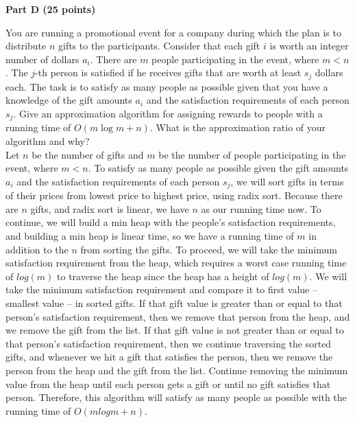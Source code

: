 \documentclass{article}
\begin{document}
\begin{center}
{\bf Part D (25 points)}
\end{center}

 You are running a promotional event for a
company during which the plan is to distribute $n$ gifts to the
participants. Consider that each gift $i$ is worth an integer number
of dollars $a_i$. There are $m$ people participating in the event,
where $m < n$. The $j$-th person is satisfied if he receives gifts
that are worth at least $s_j$ dollars each. The task is to satisfy as
many people as possible given that you have a knowledge of the gift
amounts $a_i$ and the satisfaction requirements of each person
$s_j$. Give an approximation algorithm for assigning rewards to people
with a running time of $O(m\log m+n)$. What is the approximation ratio
of your algorithm and why?\\

\noindent Let $n$ be the number of gifts and $m$ be the number of people participating in the event, where $m<n$. To satisfy as many people as possible given the gift amounts $a_i$ and the satisfaction requirements of each person $s_j$, we will sort gifts in terms of their prices from lowest price to highest price, using radix sort. Because there are $n$ gifts, and radix sort is linear, we have $n$ as our running time now. To continue, we will build a min heap with the people's satisfaction requirements, and building a min heap is linear time, so we have a running time of $m$ in addition to the $n$ from sorting the gifts. To proceed, we will take the minimum satisfaction requirement from the heap, which requires a worst case running time of $log(m)$ to traverse the heap since the heap has a height of $log(m)$. We will take the minimum satisfaction requirement and compare it to first value -- smallest value -- in sorted gifts. If that gift value is greater than or equal to that person's satisfaction requirement, then we remove that person from the heap, and we remove the gift from the list. If that gift value is not greater than or equal to that person's satisfaction requirement, then we continue traversing the sorted gifts, and whenever we hit a gift that satisfies the person, then we remove the person from the heap and the gift from the list. Continue removing the minimum value from the heap until each person gets a gift or until no gift satisfies that person. Therefore, this algorithm will satisfy as many people as possible with the running time of $O(mlogm + n)$.
\end{document}
